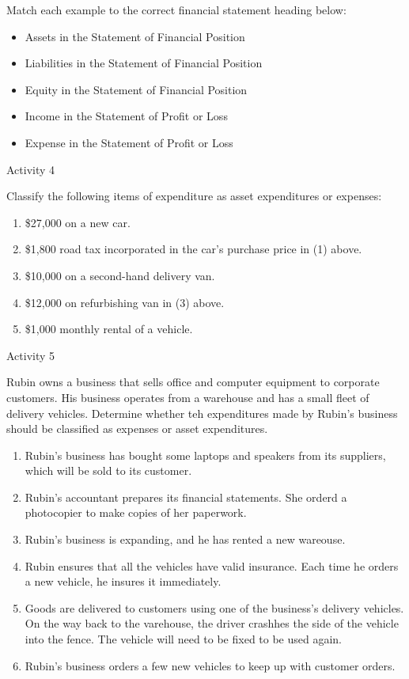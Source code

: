 Match each example to the correct financial statement heading below: 

\begin{itemize}
    \item Assets in the Statement of Financial Position 
    \item Liabilities in the Statement of Financial Position 
    \item Equity in the Statement of Financial Position 
    \item Income in the Statement of Profit or Loss 
    \item Expense in the Statement of Profit or Loss
\end{itemize} 


Activity 4 

Classify the following items of expenditure as asset expenditures or expenses: 

\begin{enumerate} 
    \item \$27,000 on a new car. 
    \item \$1,800 road tax incorporated in the car's purchase price in (1) above.
    \item \$10,000 on a second-hand delivery van. 
    \item \$12,000 on refurbishing van in (3) above. 
    \item \$1,000 monthly rental of a vehicle. 
\end{enumerate} 

Activity 5

Rubin owns a business that sells office and computer equipment to corporate customers. His business operates from a warehouse and has a small fleet of delivery 
vehicles. Determine whether teh expenditures made by Rubin's business should be classified as expenses or asset expenditures. 

\begin{enumerate}
    \item Rubin's business has bought some laptops and speakers from its suppliers, which will be sold to its customer. 
    \item Rubin's accountant prepares its financial statements. She orderd a photocopier to make copies of her paperwork.
    \item Rubin's business is expanding, and he has rented a new wareouse. 
    \item Rubin ensures that all the vehicles have valid insurance. Each time he orders a new vehicle, he insures it immediately. 
    \item Goods are delivered to customers using one of the business's delivery vehicles. On the way back to the varehouse, the driver crashhes the side of the vehicle into the fence. The vehicle will need to be fixed to be used again. 
    \item Rubin's business orders a few new vehicles to keep up with customer orders. 
\end{enumerate}

